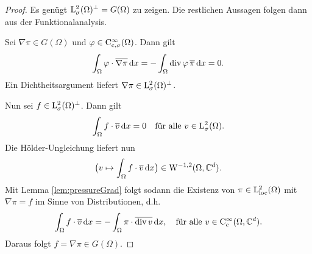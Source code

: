 \begin{proof}
  Es genügt $\mathrm{L}^2_\sigma(\Omega)^\perp = G(\Omega)$ zu zeigen.
  Die restlichen Aussagen folgen dann aus der Funktionalanalysis.
  
  Sei $\nabla\pi \in G(\Omega)$ und $\varphi \in \mathrm{C}_{\mathrm{c}, \sigma}^\infty(\Omega)$.
  Dann gilt
  $$
  \int_\Omega \varphi \cdot \overline{\nabla\pi} \, {\operatorname{d}\!{x}} = -\int_\Omega \mathrm{div\,} \varphi \, \overline \pi \, {\operatorname{d}\!{x}} = 0.
  $$
  Ein Dichtheitsargument liefert $\nabla \pi \in \mathrm{L}_\sigma^2(\Omega)^\perp$.

  Nun sei $f \in \mathrm{L}_\sigma^2(\Omega)^\perp$.
  Dann gilt 
  $$
  \int_\Omega f \cdot \overline v \, {\operatorname{d}\!{x}} = 0 \quad\text{für alle } v \in \mathrm{L}^2_\sigma(\Omega).
  $$
  Die Hölder-Ungleichung liefert nun
  $$
  \big( v \mapsto \int_\Omega f \cdot \overline v \, {\operatorname{d}\!{x}} \big) \in \mathrm{W}^{-1,2}(\Omega,\mathbb{C}^d).
  $$
  Mit Lemma \ref{lem:pressureGrad} folgt sodann die Existenz von $\pi \in \mathrm{L}^2_{\operatorname{loc}}(\Omega)$ mit $\nabla \pi = f$ im Sinne von Distributionen, d.h.
  $$
  \int_\Omega f \cdot \overline v \, {\operatorname{d}\!{x}} 
  = - \int_\Omega \pi \cdot \overline{\mathrm{div\,} v} \, {\operatorname{d}\!{x}}, \quad \text{für alle } v \in \mathrm{C}_{\mathrm{c}}^\infty(\Omega, \mathbb{C}^d).
  $$
  Daraus folgt $f = \nabla \pi \in G(\Omega)$.
\end{proof}
